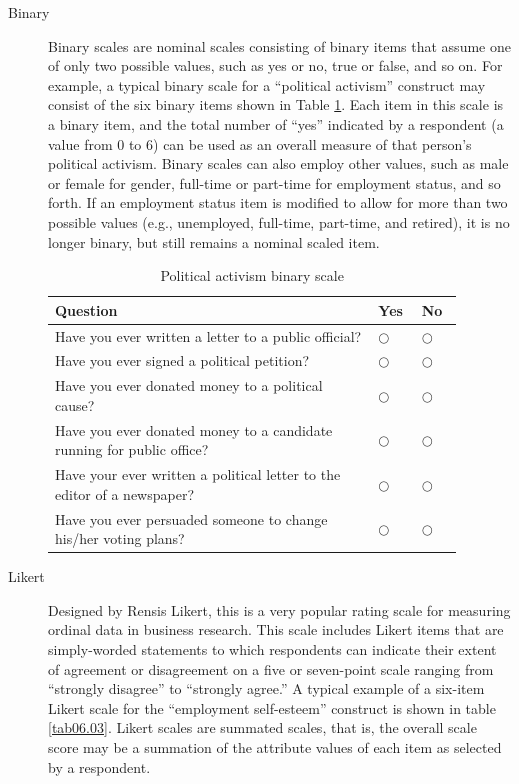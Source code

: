 \begin{description}
	\item[Binary] Binary scales are nominal scales consisting of binary items that assume one of only two possible values, such as yes or no, true or false, and so on. For example, a typical binary scale for a ``political activism'' construct may consist of the six binary items shown in Table \ref{tab06.02}. Each item in this scale is a binary item, and the total number of ``yes'' indicated by a respondent (a value from $ 0 $ to $ 6 $) can be used as an overall measure of that person's political activism. Binary scales can also employ other values, such as male or female for gender, full-time or part-time for employment status, and so forth. If an employment status item is modified to allow for more than two possible values (e.g., unemployed, full-time, part-time, and retired), it is no longer binary, but still remains a nominal scaled item.

	\begin{table}[H]
	\centering
	\begin{tabularx}{0.95\linewidth}{p{0.70\linewidth}p{0.09\linewidth}p{0.09\linewidth}}
		\toprule
		\textbf{Question} & \textbf{Yes} & \textbf{No} \\
		\midrule
		Have you ever written a letter to a public official? & $ \bigcirc $ & $ \bigcirc $ \\ 
		Have you ever signed a political petition? & $ \bigcirc $ & $ \bigcirc $ \\ 
		Have you ever donated money to a political cause? & $ \bigcirc $ & $ \bigcirc $ \\ 
		Have you ever donated money to a candidate running for public office? & $ \bigcirc $ & $ \bigcirc $ \\ 
		Have your ever written a political letter to the editor of a newspaper?& $ \bigcirc $ & $ \bigcirc $ \\ 
		Have you ever persuaded someone to change his/her voting plans? & $ \bigcirc $ & $ \bigcirc $ \\ 
		\bottomrule
	\end{tabularx}
	\caption{Political activism binary scale}
	\label{tab06.02}
	\end{table}
	
	\item[Likert] Designed by Rensis Likert, this is a very popular rating scale for measuring ordinal data in business research. This scale includes Likert items that are simply-worded statements to which respondents can indicate their extent of agreement or disagreement on a five or seven-point scale ranging from ``strongly disagree'' to ``strongly agree.'' A typical example of a six-item Likert scale for the ``employment self-esteem'' construct is shown in table \ref{tab06.03}. Likert scales are summated scales, that is, the overall scale score may be a summation of the attribute values of each item as selected by a respondent.


\end{description}
